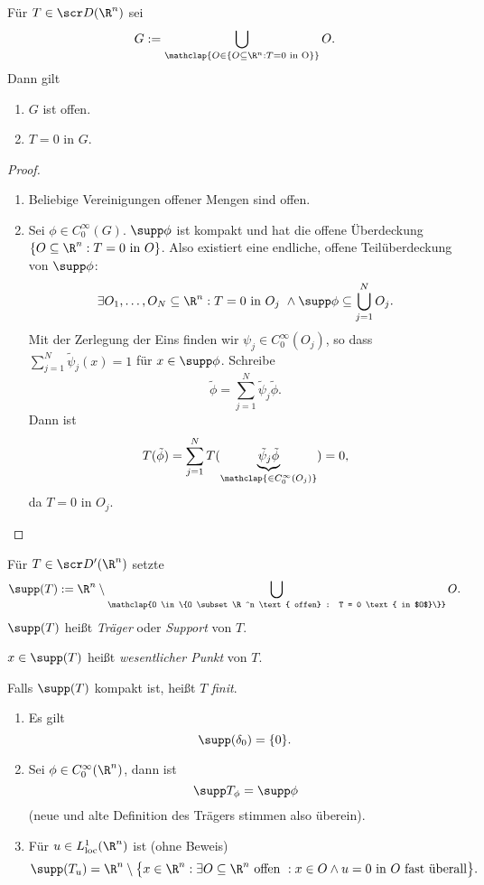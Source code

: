 \begin{st} \label{5.22}
	Für $T \in \scr D(\R^n)$ sei
	\[
		G := \bigcup_{\mathclap{O \in \{O \subset \R^n : T = 0 \text{ in O}\}}} O.
	\]
	Dann gilt
	\begin{enumerate}[1)]
		\item
			$G$ ist offen.
		\item
			$T = 0$ in $G$.
	\end{enumerate}
	\begin{proof}
		\begin{enumerate}[1)]
			\item
				Beliebige Vereinigungen offener Mengen sind offen.
			\item
				Sei $\phi \in C_0^\infty (G)$.
				$\supp \phi$ ist kompakt und hat die offene Überdeckung $\{ O \subset \R^n : T = 0 \text{ in $O$}\}$.
				Also existiert eine endliche, offene Teilüberdeckung von $\supp \phi$:
				\[
					\exists O_1, \dotsc, O_N \subset \R^n :
					T = 0 \text{ in $O_j$ }
						\land \supp \phi \subset \bigcup_{j=1}^N O_j.
				\]
				Mit der Zerlegung der Eins finden wir $\psi_j \in C_0^\infty (O_j)$, so dass $\sum_{j=1}^N \tilde \psi_j (x) = 1$ für $x \in \supp \phi$.
				Schreibe
				\[
					\tilde \phi = \sum_{j=1}^N \tilde \psi_j \tilde \phi.
				\]
				Dann ist
				\[
					T(\tilde \phi) 
					= \sum_{j=1}^N T(\underbrace{\tilde \psi_j \tilde \phi}_{\mathclap{\in C_0^\infty(O_j)}}) 
					= 0,
				\]
				da $T = 0$ in $O_j$.
		\end{enumerate}
	\end{proof}
\end{st}

\begin{df} \label{5.23}
	Für $T \in \scr D'(\R^n)$ setzte
	\[
		\supp(T) := \R^n \setminus \bigcup_{\mathclap{O \in \{O \subset \R^n \text{ offen} : T = 0 \text{ in $O$}\}}} O.
	\]
	$\supp (T)$ heißt \emph{Träger} oder \emph{Support} von $T$.

	$x \in \supp(T)$ heißt \emph{wesentlicher Punkt} von $T$.

	Falls $\supp(T)$ kompakt ist, heißt $T$ \emph{finit}.
\end{df}

\begin{ex} \label{5.24}
	\begin{enumerate}[1)]
		\item
			Es gilt
			\[
				\supp (\delta_0) = \{ 0 \}.
			\]
		\item
			Sei $\phi \in C_0^\infty(\R^n)$, dann ist
			\[
				\supp T_\phi = \supp \phi
			\]
			(neue und alte Definition des Trägers stimmen also überein).
		\item
			Für $u \in L_{\text{loc}}^1(\R^n)$ ist (ohne Beweis)
			\[
				\supp(T_u) = \R^n \setminus \big\{x \in \R^n : \exists O \subset \R^n \text{ offen } : x \in O \land u = 0 \text{ in $O$ fast überall} \big\}.
			\]
	\end{enumerate}
\end{ex}

